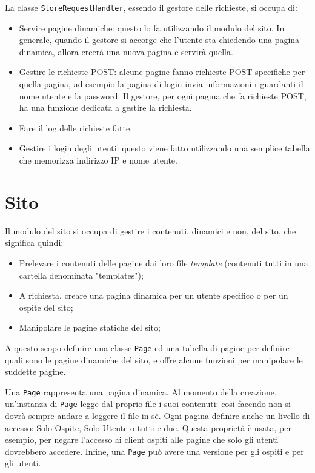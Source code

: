 \documentclass[a4paper,12pt]{report}
\begin{document}
La classe \texttt{StoreRequestHandler}, essendo il gestore delle richieste, si occupa di:
\begin{itemize}
\item Servire pagine dinamiche: questo lo fa utilizzando il modulo del sito. In generale, quando il gestore si accorge che l'utente sta chiedendo una pagina dinamica, allora creerà una nuova pagina e servirà quella.
\item Gestire le richieste POST: alcune pagine fanno richieste POST specifiche per quella pagina, ad esempio la pagina di login invia informazioni riguardanti il nome utente e la password. Il gestore, per ogni pagina che fa richieste POST, ha una funzione dedicata a gestire la richiesta.
\item Fare il log delle richieste fatte.
\item Gestire i login degli utenti: questo viene fatto utilizzando una semplice tabella che memorizza indirizzo IP e nome utente.
\end{itemize}

\section{Sito}

Il modulo del sito si occupa di gestire i contenuti, dinamici e non, del sito, che significa quindi:

\begin{itemize}
\item Prelevare i contenuti delle pagine dai loro file \textit{template} (contenuti tutti in una cartella denominata "templates");
\item A richiesta, creare una pagina dinamica per un utente specifico o per un ospite del sito;
\item Manipolare le pagine statiche del sito;
\end{itemize}

A questo scopo definire una classe \texttt{Page} ed una tabella di pagine per definire quali sono le pagine dinamiche del sito, e offre alcune funzioni per manipolare le suddette pagine.

Una \texttt{Page} rappresenta una pagina dinamica. Al momento della creazione, un'instanza di \texttt{Page} legge dal proprio file i suoi contenuti: così facendo non si dovrà sempre andare a leggere il file in sè. Ogni pagina definire anche un livello di accesso: Solo Ospite, Solo Utente o tutti e due. Questa proprietà è usata, per esempio, per negare l'accesso ai client ospiti alle pagine che solo gli utenti dovrebbero accedere. Infine, una \texttt{Page} può avere una versione per gli ospiti e per gli utenti.
\end{document}
